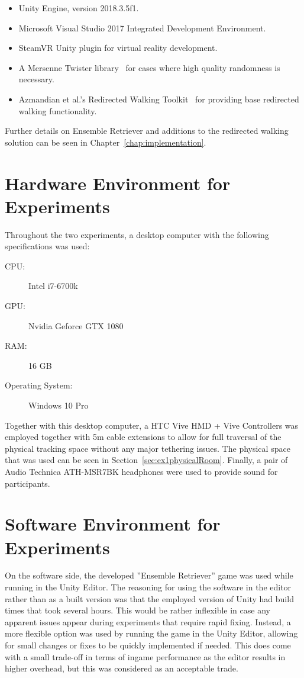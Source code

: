 \begin{itemize}
    \item Unity Engine, version 2018.3.5f1.
    \item Microsoft Visual Studio 2017 Integrated Development Environment.
    \item SteamVR Unity plugin for virtual reality development.
    \item A Mersenne Twister library~\cite{MersenneTwisterLibraryLink} for cases where high quality randomness is necessary.
    \item Azmandian et al.'s Redirected Walking Toolkit~\cite{azmandian2016redirected} for providing base redirected walking functionality.
\end{itemize}

Further details on Ensemble Retriever and additions to the redirected walking solution can be seen in Chapter~\ref{chap:implementation}.

\section{Hardware Environment for Experiments}
Throughout the two experiments, a desktop computer with the following specifications was used:
\begin{description}
   \item[CPU:] Intel i7-6700k
   \item[GPU:] Nvidia Geforce GTX 1080
   \item[RAM:] 16 GB
   \item[Operating System:] Windows 10 Pro
\end{description}

Together with this desktop computer, a HTC Vive HMD + Vive Controllers was employed together with 5m cable extensions to allow for full traversal of the physical tracking space without any major tethering issues. The physical space that was used can be seen in Section~\ref{sec:ex1physicalRoom}. Finally, a pair of Audio Technica ATH-MSR7BK headphones were used to provide sound for participants. 

\section{Software Environment for Experiments}
On the software side, the developed ''Ensemble Retriever'' game was used while running in the Unity Editor. The reasoning for using the software in the editor rather than as a built version was that the employed version of Unity had build times that took several hours. This would be rather inflexible in case any apparent issues appear during experiments that require rapid fixing. Instead, a more flexible option was used by running the game in the Unity Editor, allowing for small changes or fixes to be quickly implemented if needed. This does come with a small trade-off in terms of ingame performance as the editor results in higher overhead, but this was considered as an acceptable trade. 
